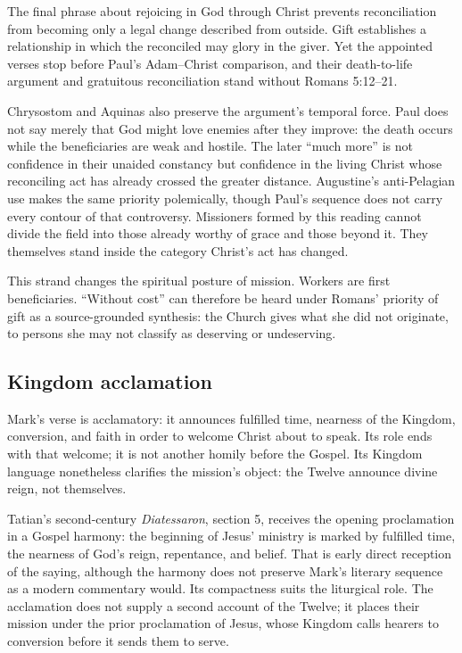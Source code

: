 The final phrase about rejoicing in God through Christ prevents reconciliation from becoming only a legal change described from outside. Gift establishes a relationship in which the reconciled may glory in the giver. Yet the appointed verses stop before Paul's Adam--Christ comparison, and their death-to-life argument and gratuitous reconciliation stand without Romans 5:12--21.

Chrysostom and Aquinas also preserve the argument's temporal force. Paul does not say merely that God might love enemies after they improve: the death occurs while the beneficiaries are weak and hostile. The later “much more” is not confidence in their unaided constancy but confidence in the living Christ whose reconciling act has already crossed the greater distance. Augustine's anti-Pelagian use makes the same priority polemically, though Paul's sequence does not carry every contour of that controversy. Missioners formed by this reading cannot divide the field into those already worthy of grace and those beyond it. They themselves stand inside the category Christ's act has changed.

This strand changes the spiritual posture of mission. Workers are first beneficiaries. “Without cost” can therefore be heard under Romans' priority of gift as a source-grounded synthesis: the Church gives what she did not originate, to persons she may not classify as deserving or undeserving.

\subsection*{Kingdom acclamation\enspace{}}

Mark's verse is acclamatory: it announces fulfilled time, nearness of the Kingdom, conversion, and faith in order to welcome Christ about to speak. Its role ends with that welcome; it is not another homily before the Gospel. Its Kingdom language nonetheless clarifies the mission's object: the Twelve announce divine reign, not themselves.

Tatian's second-century \emph{Diatessaron}, section 5, receives the opening proclamation in a Gospel harmony: the beginning of Jesus' ministry is marked by fulfilled time, the nearness of God's reign, repentance, and belief. That is early direct reception of the saying, although the harmony does not preserve Mark's literary sequence as a modern commentary would. Its compactness suits the liturgical role. The acclamation does not supply a second account of the Twelve; it places their mission under the prior proclamation of Jesus, whose Kingdom calls hearers to conversion before it sends them to serve.

